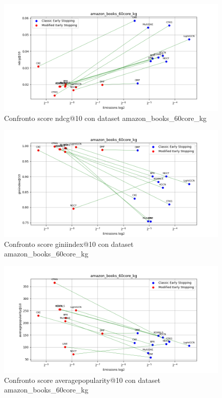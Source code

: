 \begin{figure}[H]
    \centering
    \includegraphics[width=\linewidth, trim=0 0 0 0]{images/ndcg@10_amazon_books_60core_kg_comparison.png}
    \caption{Confronto score ndcg@10 con dataset amazon\_books\_60core\_kg}
    
\end{figure}

\begin{figure}[H]
    \centering
    \includegraphics[width=\linewidth, trim=0 0 0 0]{images/giniindex@10_amazon_books_60core_kg_comparison.png}
    \caption{Confronto score giniindex@10 con dataset amazon\_books\_60core\_kg}
\end{figure}

\begin{figure}[H]
    \centering
    \includegraphics[width=\linewidth, trim=0 0 0 0]{images/averagepopularity@10_amazon_books_60core_kg_comparison.png}
    \caption{Confronto score averagepopularity@10 con dataset amazon\_books\_60core\_kg}
\end{figure}


